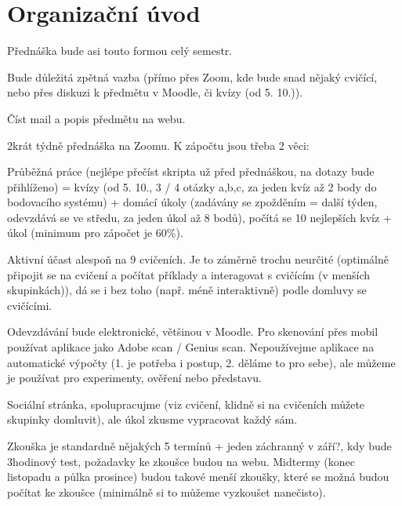 \documentclass[12pt]{article}					%
\begin{document}
\section*{Organizační úvod}
    Přednáška bude asi touto formou celý semestr.
    \begin{upozorneni}
        Bude důležitá zpětná vazba (přímo přes Zoom, kde bude snad nějaký cvičící, nebo přes diskuzi k předmětu v Moodle, či kvízy (od 5. 10.)).
    \end{upozorneni}
    \begin{poznamka}
        Číst mail a popis předmětu na webu.
    \end{poznamka}
    \begin{poznamka}[Organizace]
        2krát týdně přednáška na Zoomu. K zápočtu jsou třeba 2 věci:

        Průběžná práce (nejlépe přečíst skripta už před přednáškou, na dotazy bude přihlíženo) = kvízy (od 5. 10., 3 / 4 otázky a,b,c, za jeden kvíz až 2 body do bodovacího systému) + domácí úkoly (zadávány se zpožděním = další týden, odevzdává se ve středu, za jeden úkol až 8 bodů), počítá se 10 nejlepších kvíz + úkol (minimum pro zápočet je 60\%).

        Aktivní účast alespoň na 9 cvičeních. Je to záměrně trochu neurčité (optimálně připojit se na cvičení a počítat příklady a interagovat s cvičícím (v menších skupinkách)), dá se i bez toho (např. méně interaktivně) podle domluvy se cvičícími.

        Odevzdávání bude elektronické, většinou v Moodle. Pro skenování přes mobil používat aplikace jako Adobe scan / Genius scan. Nepoužívejme aplikace na automatické výpočty (1. je potřeba i postup, 2. děláme to pro sebe), ale můžeme je používat pro experimenty, ověření nebo představu.

        Sociální stránka, spolupracujme (viz cvičení, klidně si na cvičeních můžete skupinky domluvit), ale úkol zkusme vypracovat každý sám.

        Zkouška je standardně nějakých 5 termínů + jeden záchranný v září?, kdy bude 3hodinový test, požadavky ke zkoušce budou na webu. Midtermy (konec listopadu a půlka prosince) budou takové menší zkoušky, které se možná budou počítat ke zkoušce (minimálně si to můžeme vyzkoušet nanečisto).

    \end{poznamka}
\end{document}
